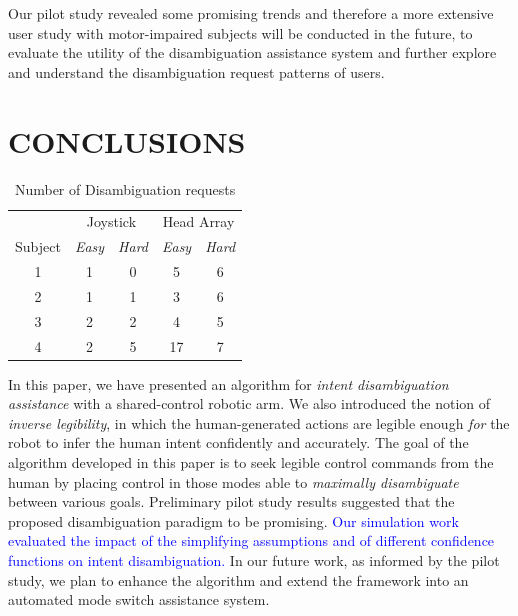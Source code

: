\documentclass[conference]{IEEEtran}
\begin{document}
Our pilot study revealed some promising trends and therefore a more extensive user study with motor-impaired subjects will be conducted in the future, to evaluate the utility of the disambiguation assistance system and further explore and understand the disambiguation request patterns of users.
\section{CONCLUSIONS}\label{DC}
\begin{table}[t]
	\centering
	\begin{tabular}{ccccc}
		\toprule
		&\multicolumn{2}{c}{Joystick}
		&
		\multicolumn{2}{c}{Head Array} \\\cmidrule(r){2-3}\cmidrule(l){4-5}
		Subject &\textit{Easy}& \textit{Hard}    & \textit{Easy} &\textit{Hard}      \\
		\bottomrule
		1 &1& 0   & 5 & 6  \\
		\bottomrule
		2 &1& 1    & 3 & 6      \\
		\bottomrule
		3 &2& 2    & 4 &5    \\
		\bottomrule
		4 &2& 5    & 17 &7   \\
		\bottomrule
	\end{tabular}
	\vspace{.2cm}
	\caption{Number of Disambiguation requests}
	\label{ONDEMAND}
\end{table}
In this paper, we have presented an algorithm for \textit{intent disambiguation assistance} with a shared-control robotic arm. We also introduced the notion of \textit{inverse legibility}, in which the human-generated actions are legible enough \textit{for} the robot to infer the human intent confidently and accurately. The goal of the algorithm developed in this paper is to seek legible control commands from the human by placing control in those modes able to \textit{maximally disambiguate} between various goals. Preliminary pilot study results suggested that the proposed disambiguation paradigm to be promising. \textcolor{blue}{Our simulation work evaluated the impact of the simplifying assumptions and of different confidence functions on intent disambiguation.} In our future work, as informed by the pilot study, we plan to enhance the algorithm and extend the framework into an automated mode switch assistance system. 
\end{document}
